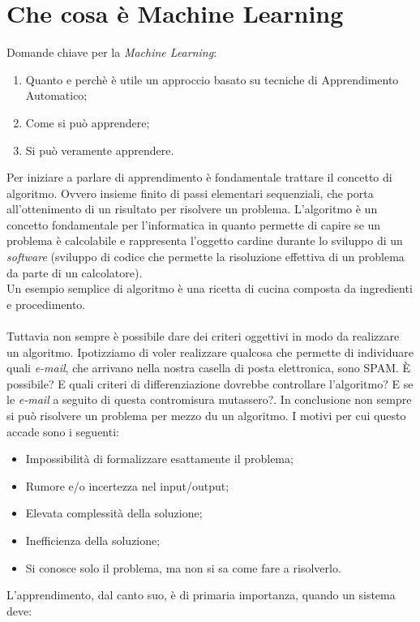 \documentclass[10pt,a4paper]{book}
\begin{document}
\section{Che cosa \`e Machine Learning}
Domande chiave per la \textit{Machine Learning}:
\begin{enumerate}
\item Quanto e perch\`e \`e utile un approccio basato su tecniche di Apprendimento Automatico;
\item Come si pu\`o apprendere;
\item Si pu\`o veramente apprendere.
\end{enumerate}
\noindent
Per iniziare a parlare di apprendimento \`e fondamentale trattare il concetto di algoritmo. Ovvero insieme finito di passi elementari sequenziali, che porta all'ottenimento di un risultato per risolvere un problema. L'algoritmo \`e un concetto fondamentale per l'informatica in quanto permette di capire se un problema \`e calcolabile e rappresenta l'oggetto cardine durante lo sviluppo di un \textit{software} (sviluppo di codice che permette la risoluzione effettiva di un problema da parte di un calcolatore).\\
Un esempio semplice di algoritmo \`e una ricetta di cucina composta da ingredienti e procedimento.\\\\
Tuttavia non sempre \`e possibile dare dei criteri oggettivi in modo da realizzare un algoritmo. Ipotizziamo di voler realizzare qualcosa che permette di individuare quali \textit{e-mail}, che arrivano nella nostra casella di posta elettronica, sono SPAM. \`E possibile? E quali criteri di differenziazione dovrebbe controllare l'algoritmo? E se le \textit{e-mail} a seguito di questa contromisura mutassero?. In conclusione non sempre si pu\`o risolvere un problema per mezzo du un algoritmo. I motivi per cui questo accade sono i seguenti:
\begin{itemize}
\item Impossibilit\`a di formalizzare esattamente il problema;
\item Rumore e/o incertezza nel input/output;
\item Elevata complessit\`a della soluzione;
\item Inefficienza della soluzione;
\item Si conosce solo il problema, ma non si sa come fare a risolverlo.
\end{itemize}
\noindent
L'apprendimento, dal canto suo, \`e di primaria importanza, quando un sistema deve:
\end{document}
